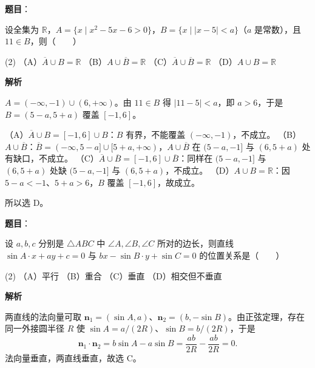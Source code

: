 \begin{answer}

\textbf{题目}：

设全集为 $\mathbb R$，$A=\{x\mid x^2-5x-6>0\}$，$B=\{x\mid |x-5|<a\}$（$a$ 是常数），且 $11\in B$，则\mbox{（　　）}

\begin{gkopts}(2)
\task （A）$\overline A\cup B=\mathbb R$
\task （B）$A\cup\overline B=\mathbb R$
\task （C）$\overline A\cup\overline B=\mathbb R$
\task （D）$A\cup B=\mathbb R$
\end{gkopts}

\textbf{解析}

$A=(-\infty,-1)\cup(6,+\infty)$。由 $11\in B$ 得 $|11-5|<a$，即 $a>6$，于是 $B=(5-a,5+a)$ 覆盖 $[-1,6]$。

（A）$\overline A\cup B=[-1,6]\cup B$：$B$ 有界，不能覆盖 $(-\infty,-1)$，不成立。
（B）$A\cup\overline B$：$\overline B=(-\infty,5-a]\cup[5+a,+\infty)$，$A\cup\overline B$ 在 $(5-a,-1]$ 与 $(6,5+a)$ 处有缺口，不成立。
（C）$\overline A\cup\overline B=[-1,6]\cup\overline B$：同样在 $(5-a,-1]$ 与 $(6,5+a)$ 处缺 $(5-a,-1]$ 与 $(6,5+a)$，不成立。
（D）$A\cup B=\mathbb R$：因 $5-a<-1$、$5+a>6$，$B$ 覆盖 $[-1,6]$，故成立。

所以选 D。


\end{answer}
\begin{answer}

\textbf{题目}：

设 $a,b,c$ 分别是 $\triangle ABC$ 中 $\angle A,\angle B,\angle C$ 所对的边长，则直线 $\sin A\cdot x+ay+c=0$ 与 $bx-\sin B\cdot y+\sin C=0$ 的位置关系是\mbox{（　　）}

\begin{gkopts}(2)
\task （A）平行
\task （B）重合
\task （C）垂直
\task （D）相交但不垂直
\end{gkopts}

\textbf{解析}

两直线的法向量可取 $\boldsymbol n_1=(\sin A,a)$、$\boldsymbol n_2=(b,-\sin B)$。由正弦定理，存在同一外接圆半径 $R$ 使 $\sin A=a/(2R)$、$\sin B=b/(2R)$，于是
\nopagebreak[4]
\[
\boldsymbol n_1\cdot\boldsymbol n_2=b\sin A-a\sin B=\frac{ab}{2R}-\frac{ab}{2R}=0.
\]
法向量垂直，两直线垂直，故选 C。


\end{answer}
